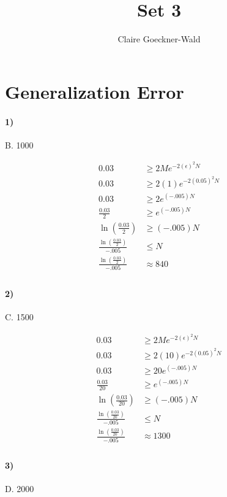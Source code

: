 \documentclass[10pt,letter]{article}
\begin{document}
\title{Set 3}
\author{Claire Goeckner-Wald}
\maketitle 

\section*{Generalization Error}

\paragraph{1)} B. 1000

	\begin{align*}
	0.03 &\geq 2 M e ^{-2(\epsilon)^2N} \\
	0.03 &\geq 2 (1) e ^{-2(0.05)^2N} \\
	0.03 &\geq 2 e ^{(-.005)N} \\
	\frac{0.03}{2} &\geq e ^{(-.005)N} \\
	\ln (\frac{0.03}{2}) &\geq (-.005)N \\
	\frac{\ln (\frac{0.03}{2})}{-.005} &\leq N \\
	\frac{\ln (\frac{0.03}{2})}{-.005} &\approx 840 \\
	\end{align*}

\paragraph{2)} C. 1500

	\begin{align*}
	0.03 &\geq 2 M e ^{-2(\epsilon)^2N} \\
	0.03 &\geq 2 (10) e ^{-2(0.05)^2N} \\
	0.03 &\geq 20 e ^{(-.005)N} \\
	\frac{0.03}{20} &\geq e ^{(-.005)N} \\
	\ln (\frac{0.03}{20}) &\geq (-.005)N \\
	\frac{\ln (\frac{0.03}{20})}{-.005} &\leq N \\
	\frac{\ln (\frac{0.03}{20})}{-.005} &\approx 1300 \\
	\end{align*}


\paragraph{3)} D. 2000
\end{document}
